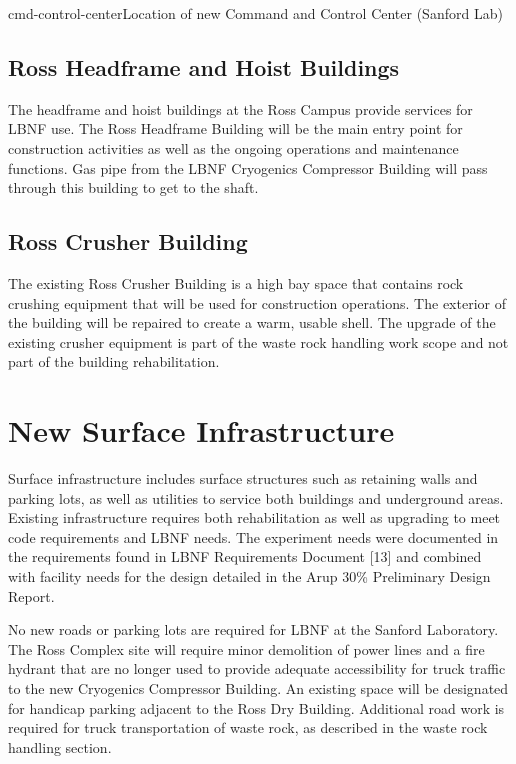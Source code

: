 \begin{cdrfigure}{cmd-control-center}{Location of new Command and Control Center (Sanford Lab)}
\end{cdrfigure}

\subsection{Ross Headframe and Hoist Buildings}
\label{sec:fscf-surf-facil-surface-bldg-rosshead}

The headframe and hoist buildings at the Ross Campus provide services for LBNF use. The Ross Headframe Building will be the main entry point for construction activities as well as the ongoing operations and maintenance functions. Gas pipe from the LBNF Cryogenics Compressor Building will pass through this building to get to the shaft.  

\subsection{Ross Crusher Building}
\label{sec:fscf-surf-facil-surface-bldg-rosscrusher}

The existing Ross Crusher Building is a high bay space that contains rock crushing equipment that will be used for construction operations. The exterior of the building will be repaired to create a warm, usable shell. The upgrade of the existing crusher equipment is part of the waste rock handling work scope and not part of the building rehabilitation.

\section{New Surface Infrastructure}
\label{sec:fscf-surf-facil-surface-new}

Surface infrastructure includes surface structures such as retaining walls and parking lots, as well as utilities to service both buildings and underground areas. Existing infrastructure requires both rehabilitation as well as upgrading to meet code requirements and LBNF needs. The experiment needs were documented in the requirements found in LBNF Requirements Document [13] and combined with facility needs for the design detailed in the Arup 30\% Preliminary Design Report.

No new roads or parking lots are required for LBNF at the Sanford Laboratory.  The Ross Complex site will require minor demolition of power lines and a fire hydrant that are no longer used to provide adequate accessibility for truck traffic to the new Cryogenics Compressor Building.  An existing space will be designated for handicap parking adjacent to the Ross Dry Building.  Additional road work is required for truck transportation of waste rock, as described in the waste rock handling section.

